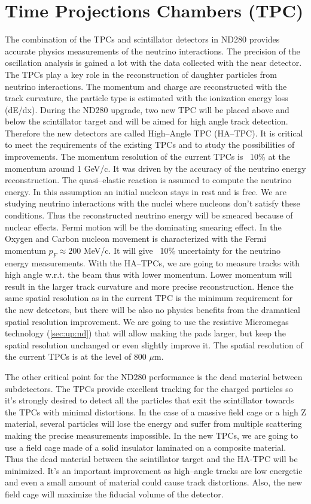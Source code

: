 \documentclass[../main.tex]{subfiles}
\begin{document}
\chapter{Time Projections Chambers (TPC)}
\label{ch:up:tpc}
The combination of the TPCs and scintillator detectors in ND280 provides accurate physics measurements of the neutrino interactions. The precision of the oscillation analysis is gained a lot with the data collected with the near detector. The TPCs play a key role in the reconstruction of daughter particles from neutrino interactions. The momentum and charge are reconstructed with the track curvature, the particle type is estimated with the ionization energy loss (dE/dx). During the ND280 upgrade, two new TPC will be placed above and below the scintillator target and will be aimed for high angle track detection. Therefore the new detectors are called High--Angle TPC (HA--TPC). It is critical to meet the requirements of the existing TPCs and to study the possibilities of improvements. The momentum resolution of the current TPCs is ~10\% at the momentum around 1 GeV/c. It was driven by the accuracy of the neutrino energy reconstruction. The quasi--elastic reaction is assumed to compute the neutrino energy. In this assumption an initial nucleon stays in rest and is free. We are studying neutrino interactions with the nuclei where nucleons don't satisfy these conditions. Thus the reconstructed neutrino energy will be smeared because of nuclear effects. Fermi motion will be the dominating smearing effect. In the Oxygen and Carbon nucleon movement is characterized with the Fermi momentum $p_F\approx 200$ MeV/c. It will give ~10\% uncertainty for the neutrino energy measurements. With the HA--TPCs, we are going to measure tracks with high angle w.r.t. the beam thus with lower momentum. Lower momentum will result in the larger track curvature and more precise reconstruction. Hence the same spatial resolution as in the current TPC is the minimum requirement for the new detectors, but there will be also no physics benefits from the dramatical spatial resolution improvement. We are going to use the resistive Micromegas technology (\autoref{sec:up:nd}) that will allow making the pads larger, but keep the spatial resolution unchanged or even slightly improve it. The spatial resolution of the current TPCs is at the level of 800 $\mu\text{m}$.

The other critical point for the ND280 performance is the dead material between subdetectors. The TPCs provide excellent tracking for the charged particles so it's strongly desired to detect all the particles that exit the scintillator towards the TPCs with minimal distortions. In the case of a massive field cage or a high Z material, several particles will lose the energy and suffer from multiple scattering making the precise measurements impossible. In the new TPCs, we are going to use a field cage made of a solid insulator laminated on a composite material. Thus the dead material between the scintillator target and the HA-TPC will be minimized. It's an important improvement as high--angle tracks are low energetic and even a small amount of material could cause track distortions. Also, the new field cage will maximize the fiducial volume of the detector.
\end{document}
